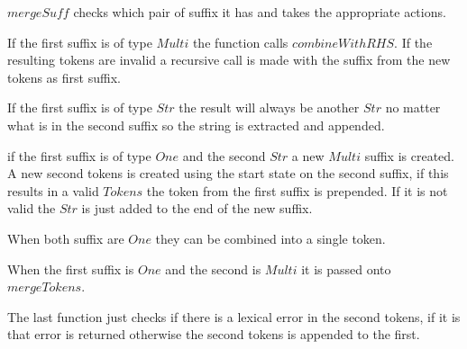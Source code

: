 $mergeSuff$ checks which pair of suffix it has and takes the appropriate
actions.

If the first suffix is of type $Multi$ the function calls $combineWithRHS$. If
the resulting tokens are invalid a recursive call is made with the suffix from
the new tokens as first suffix.

If the first suffix is of type $Str$ the result will always be another $Str$ no
matter what is in the second suffix so the string is extracted and appended.

if the first suffix is of type $One$ and the second $Str$ a new $Multi$ suffix
is created. A new second tokens is created using the start state on the second
suffix, if this results in a valid $Tokens$ the token from the first suffix is
prepended. If it is not valid the $Str$ is just added to the end of the new
suffix.

When both suffix are $One$ they can be combined into a single token.

When the first suffix is $One$ and the second is $Multi$ it is passed onto
$mergeTokens$.

The last function just checks if there is a lexical error in the second tokens,
if it is that error is returned otherwise the second tokens is appended to the
first.

